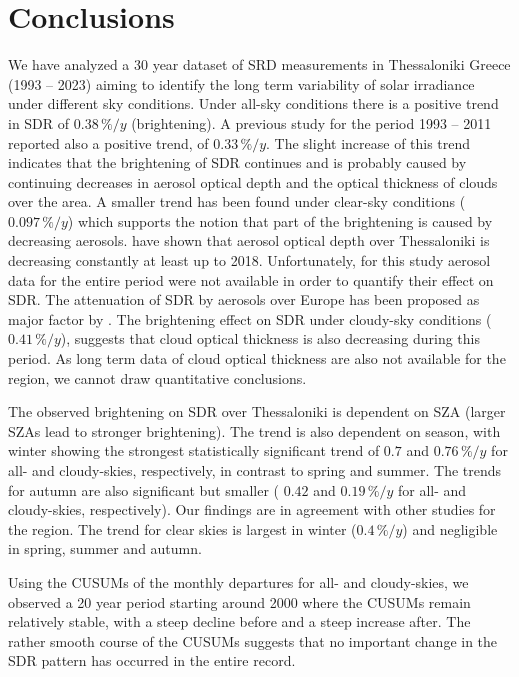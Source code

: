 \documentclass[applsci,article,submit,moreauthors,pdftex]{Definitions/mdpi}
\begin{document}
\hypertarget{conclusions}{%
\section{Conclusions}\label{conclusions}}

We have analyzed a 30 year dataset of SRD measurements in Thessaloniki
Greece (1993 -- 2023) aiming to identify the long term variability of
solar irradiance under different sky conditions. Under all-sky
conditions there is a positive trend in SDR of \(0.38\,\%/y\)
(brightening). A previous study \citep{Bais2013} for the period 1993 --
2011 reported also a positive trend, of \(0.33\,\%/y\). The slight
increase of this trend indicates that the brightening of SDR continues
and is probably caused by continuing decreases in aerosol optical depth
and the optical thickness of clouds over the area. A smaller trend has
been found under clear-sky conditions (\(0.097\,\%/y\)) which supports
the notion that part of the brightening is caused by decreasing
aerosols. \citet{Siomos2020} have shown that aerosol optical depth over
Thessaloniki is decreasing constantly at least up to 2018.
Unfortunately, for this study aerosol data for the entire period were
not available in order to quantify their effect on SDR. The attenuation
of SDR by aerosols over Europe has been proposed as major factor by
\citet{Wild2021}. The brightening effect on SDR under cloudy-sky
conditions (\(0.41\,\%/y\)), suggests that cloud optical thickness is
also decreasing during this period. As long term data of cloud optical
thickness are also not available for the region, we cannot draw
quantitative conclusions.

The observed brightening on SDR over Thessaloniki is dependent on SZA
(larger SZAs lead to stronger brightening). The trend is also dependent
on season, with winter showing the strongest statistically significant
trend of \(0.7\) and \(0.76\,\%/y\) for all- and cloudy-skies,
respectively, in contrast to spring and summer. The trends for autumn
are also significant but smaller ( \(0.42\) and \(0.19\,\%/y\) for all-
and cloudy-skies, respectively). Our findings are in agreement with
other studies for the region. The trend for clear skies is largest in
winter (\(0.4\,\%/y\)) and negligible in spring, summer and autumn.

Using the CUSUMs of the monthly departures for all- and cloudy-skies, we
observed a 20 year period starting around 2000 where the CUSUMs remain
relatively stable, with a steep decline before and a steep increase
after. The rather smooth course of the CUSUMs suggests that no important
change in the SDR pattern has occurred in the entire record.
\end{document}

